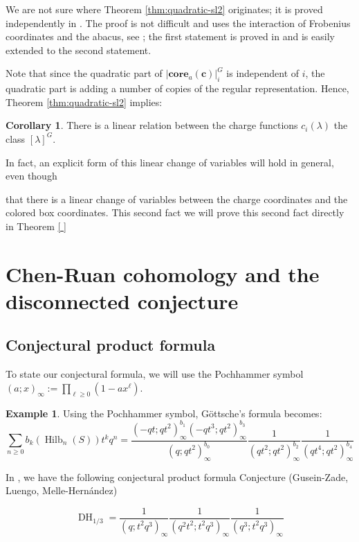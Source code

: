 \documentclass{amsart}[12pt]
\theoremstyle{definition}
\newtheorem{example}[dummy]{Example}
\newtheorem{corollary}[dummy]{Corollary}
\newcommand{\core}{\mathbf{core}}
\DeclareMathOperator{\Hilb}{Hilb}
\DeclareMathOperator{\DC}{DH}
\begin{document}
We are not sure where Theorem \ref{thm:quadratic-sl2} originates; it is proved independently in \cite{GKS, DS}.  The proof is not difficult and uses the interaction of Frobenius coordinates and the abacus, see ; the first statement is proved in \cite{jsimultaneous} and is easily extended to the second statement. 


Note that since the quadratic part of $|\core_a(\mathbf{c})|^G_i$ is independent of $i$, the quadratic part is adding a number of copies of the regular representation.  Hence, Theorem \ref{thm:quadratic-sl2} implies:




\begin{corollary} 
There is a linear relation between the charge functions $c_i(\lambda)$ the class $[\lambda]^G$.
\end{corollary}

In fact, an explicit form of this linear change of variables will hold in general, even though



 that there is a linear change of variables between the charge coordinates and the colored box coordinates.  This second fact we will prove this second fact directly in Theorem \ref{ }



\section{Chen-Ruan cohomology and the disconnected conjecture}


\subsection{Conjectural product formula}

To state our conjectural formula, we will use the Pochhammer symbol $(a;x)_\infty:=\prod_{\ell\geq 0} (1-ax^\ell)$.
\begin{example}
Using the Pochhammer symbol, G\"ottsche's formula becomes:
$$\sum_{n\geq 0} b_k(\Hilb_n(S))t^kq^n=\frac{(-qt;qt^2)_\infty^{b_1}(-qt^3;qt^2)_\infty^{b_3}}{(q;qt^2)_\infty^{b_0}}\frac{1}{(qt^2;qt^2)_\infty^{b_2}}\frac{1}{(qt^4;qt^2)_\infty^{b_4}}$$
\end{example}

In \cite{GLMequivariant}, we have the following conjectural product formula 
{Conjecture (Gusein-Zade, Luengo, Melle-Hern\'andez)}

$$\DC_{1/3}=\frac{1}{(q;t^2q^3)_\infty}\frac{1}{(q^2t^2;t^2q^3)_\infty}\frac{1}{(q^3;t^2q^3)_\infty}$$
\end{document}
